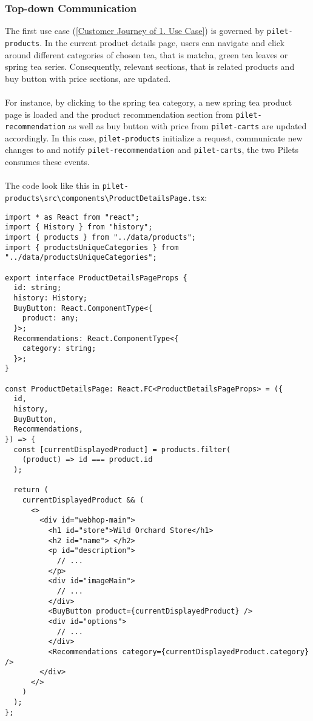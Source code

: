 \documentclass[a4paper]{book}
\begin{document}
\subsubsection{Top-down Communication}
The first use case (\ref{Customer Journey of 1. Use Case}) is governed by \verb|pilet-products|. In the current product details page, users can navigate and click around different categories of chosen tea, that is matcha, green tea leaves or spring tea series. Consequently, relevant sections, that is related products and buy button with price sections, are updated.
\\ \\
For instance, by clicking to the spring tea category, a new spring tea product page is loaded and the product recommendation section from \verb|pilet-recommendation| as well as buy button with price from \verb|pilet-carts| are updated accordingly. In this case, \verb|pilet-products| initialize a request, communicate new changes to and notify \verb|pilet-recommendation| and \verb|pilet-carts|, the two Pilets consumes these events.
\\ \\
The code look like this in \verb|pilet-products\src\components\ProductDetailsPage.tsx|:
\begin{lstlisting}[caption={ProductDetailsPage passes product data directly to extended components}]
import * as React from "react";
import { History } from "history";
import { products } from "../data/products";
import { productsUniqueCategories } from "../data/productsUniqueCategories";

export interface ProductDetailsPageProps {
  id: string;
  history: History;
  BuyButton: React.ComponentType<{
    product: any;
  }>;
  Recommendations: React.ComponentType<{
    category: string;
  }>;
}

const ProductDetailsPage: React.FC<ProductDetailsPageProps> = ({
  id,
  history,
  BuyButton,
  Recommendations,
}) => {
  const [currentDisplayedProduct] = products.filter(
    (product) => id === product.id
  );

  return (
    currentDisplayedProduct && (
      <>
        <div id="webhop-main">
          <h1 id="store">Wild Orchard Store</h1>
          <h2 id="name"> </h2>
          <p id="description">
            // ...
          </p>
          <div id="imageMain">
            // ...
          </div>
          <BuyButton product={currentDisplayedProduct} />
          <div id="options">
            // ...
          </div>
          <Recommendations category={currentDisplayedProduct.category} />
        </div>
      </>
    )
  );
};
\end{lstlisting}
\end{document}
